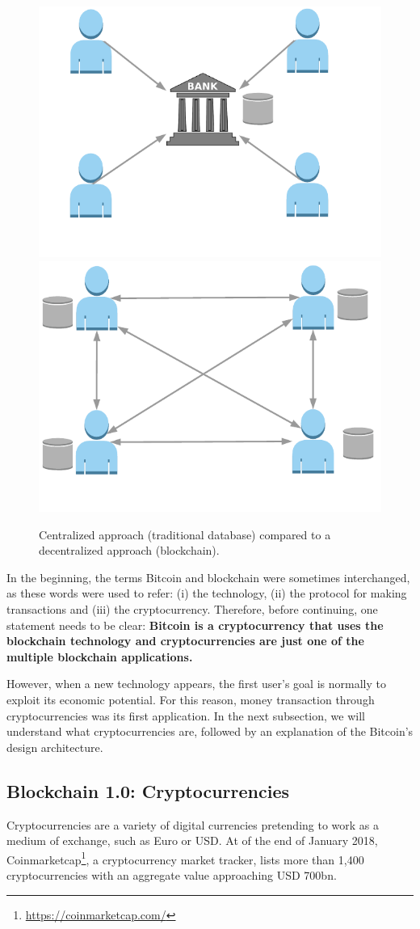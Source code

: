 \begin{figure}[bth]
	\myfloatalign
	{\includegraphics[width=0.4\linewidth]{gfx/cenVsDec}} \quad
	{\includegraphics[width=0.4\linewidth]{gfx/cenVsDec2}} \\
	\caption{Centralized approach (traditional database) compared to a decentralized approach (blockchain).}
	\label{fig:CentralizedvsDecentralized}
\end{figure}

In the beginning, the terms Bitcoin and blockchain were sometimes interchanged, as these words were used to refer: (i) the technology, (ii) the protocol for making transactions and (iii) the cryptocurrency. Therefore, before continuing, one statement needs to be clear: \textbf{Bitcoin is a cryptocurrency that uses the blockchain technology and cryptocurrencies are just one of the multiple blockchain applications.} 

However, when a new technology appears, the first user's goal is normally to exploit its economic potential. For this reason, money transaction through cryptocurrencies was its first application. In the next subsection, we will understand what cryptocurrencies are, followed by an explanation of the Bitcoin's design architecture.

\subsection{Blockchain 1.0: Cryptocurrencies}

Cryptocurrencies are a variety of digital currencies pretending to work as a medium of exchange, such as Euro or USD. At of the end of January 2018, Coinmarketcap\footnote{\url{https://coinmarketcap.com/}}, a cryptocurrency market tracker, lists more than 1,400 cryptocurrencies with an aggregate value approaching USD 700bn. 

